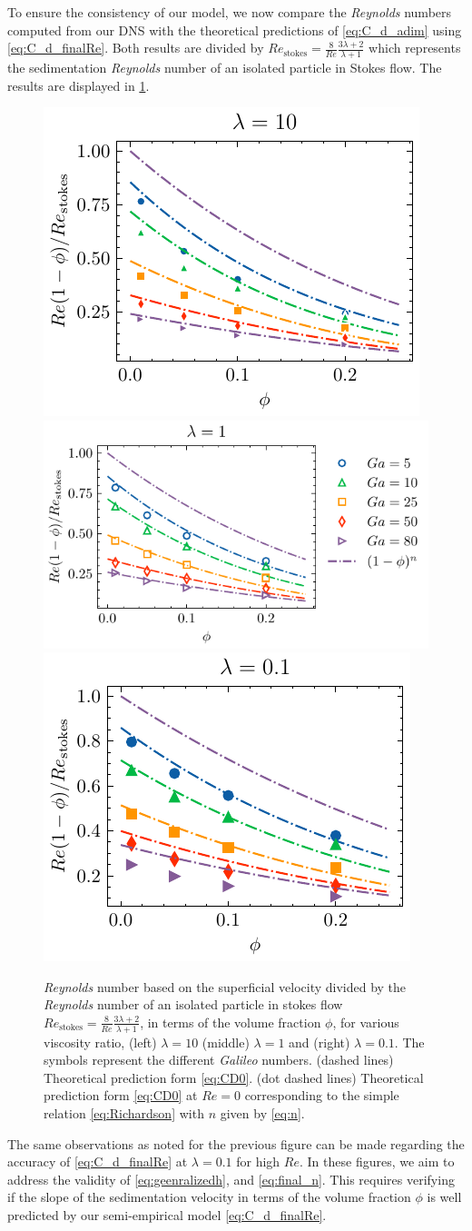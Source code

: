 To ensure the consistency of our model, we now compare the \textit{Reynolds} numbers computed from our DNS with the theoretical predictions of \ref{eq:C_d_adim} using \ref{eq:C_d_finalRe}. 
Both results are divided by $Re_\text{stokes} = \frac{8}{Re} \frac{3\lambda +2}{\lambda+1}$ which represents the sedimentation \textit{Reynolds} number of an isolated particle in Stokes flow.  
The results are displayed in \ref{fig:Reasim}. 
\begin{figure}[h!]
    \centering
    \includegraphics[height = 0.23\textwidth]{image/HOMOGENEOUS_final/CA/U_l_10.pdf}
    \includegraphics[height = 0.23\textwidth]{image/HOMOGENEOUS_final/CA/U_l_1.pdf}
    \includegraphics[height = 0.23\textwidth]{image/HOMOGENEOUS_final/CA/U_l_0.pdf}
    \caption{
        \textit{Reynolds} number based on the superficial velocity divided by the \textit{Reynolds} number of an isolated particle in stokes flow $Re_\text{stokes}= \frac{8}{Re} \frac{3\lambda +2}{\lambda+1}$, in terms of the volume fraction $\phi$, for various viscosity ratio, (left) $\lambda  = 10$ (middle) $\lambda =1$ and (right) $\lambda = 0.1$. 
        The symbols represent the different \textit{Galileo} numbers. 
        (dashed lines) Theoretical prediction form \ref{eq:CD0}. 
        (dot dashed lines) Theoretical prediction form \ref{eq:CD0} at $Re = 0$ corresponding to the simple relation \ref{eq:Richardson} with $n$ given by \ref{eq:n}. 
    }
    \label{fig:Reasim}
\end{figure}
The same observations as noted for the previous figure can be made regarding the accuracy of \ref{eq:C_d_finalRe} at $\lambda = 0.1$ for high $Re$. 
In these figures, we aim to address the validity of \ref{eq:geenralizedh}, and \ref{eq:final_n}. 
This requires verifying if the slope of the sedimentation velocity in terms of the volume fraction $\phi$ is well predicted by our semi-empirical model \eqref{eq:C_d_finalRe}. 


